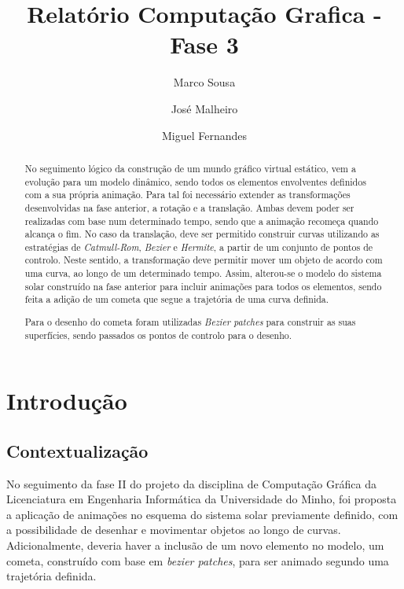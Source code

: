 \documentclass[runningheads]{llncs}
\begin{document}
%
\title{Relatório Computação Grafica - Fase 3}
\author{Marco Sousa \and
    José Malheiro \and
    Miguel Fernandes}
%
%
\maketitle              %
%
\begin{abstract}
    No seguimento lógico da construção de um mundo gráfico virtual estático, vem a evolução para um modelo dinâmico, sendo todos os elementos envolventes definidos com a sua própria animação. Para tal foi necessário extender as transformações desenvolvidas na fase anterior, a rotação e a translação. 
    Ambas devem poder ser realizadas com base num determinado tempo, sendo que a animação recomeça quando alcança o fim.
    No caso da translação, deve ser permitido construir curvas utilizando as estratégias de \textit{Catmull-Rom}, \textit{Bezier} e \textit{Hermite}, a partir de um conjunto de pontos de controlo. 
    Neste sentido, a transformação deve permitir mover um objeto de acordo com uma curva, ao longo de um determinado tempo.
    Assim, alterou-se o modelo do sistema solar construído na fase anterior para incluir animações para todos os elementos, sendo feita a adição de um cometa que segue a trajetória de uma curva definida.
    
    Para o desenho do cometa foram utilizadas \textit{Bezier patches} para construir as suas superfícies, sendo passados os pontos de controlo para o desenho.
    
    \end{abstract}
    \section{Introdução}
    \subsection{Contextualização}
    No seguimento da fase II do projeto da disciplina de Computação Gráfica da Licenciatura em Engenharia Informática da Universidade do Minho, foi proposta a aplicação de animações no esquema do sistema solar previamente definido, com a possibilidade de desenhar e movimentar objetos ao longo de curvas. 
    Adicionalmente, deveria haver a inclusão de um novo elemento no modelo, um cometa, construído com base em \textit{bezier patches}, para ser animado segundo uma trajetória definida.
    
\end{document}
